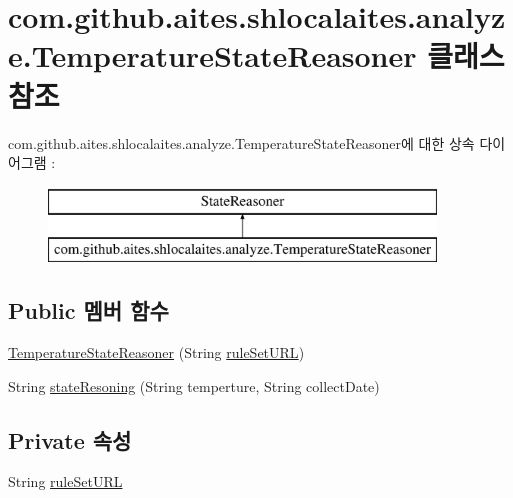 \hypertarget{classcom_1_1github_1_1aites_1_1shlocalaites_1_1analyze_1_1_temperature_state_reasoner}{}\section{com.\+github.\+aites.\+shlocalaites.\+analyze.\+Temperature\+State\+Reasoner 클래스 참조}
\label{classcom_1_1github_1_1aites_1_1shlocalaites_1_1analyze_1_1_temperature_state_reasoner}
com.\+github.\+aites.\+shlocalaites.\+analyze.\+Temperature\+State\+Reasoner에 대한 상속 다이어그램 \+: \begin{figure}[H]
\begin{center}
\leavevmode
\includegraphics[height=2.000000cm]{classcom_1_1github_1_1aites_1_1shlocalaites_1_1analyze_1_1_temperature_state_reasoner}
\end{center}
\end{figure}
\subsection*{Public 멤버 함수}
\begin{DoxyCompactItemize}
\item 
\mbox{\hyperlink{classcom_1_1github_1_1aites_1_1shlocalaites_1_1analyze_1_1_temperature_state_reasoner_aeb0acd0cdfb8efdc2eed85ad10fbeddb}{Temperature\+State\+Reasoner}} (String \mbox{\hyperlink{classcom_1_1github_1_1aites_1_1shlocalaites_1_1analyze_1_1_temperature_state_reasoner_af2c499ddf5d8d5cc0394b6ba37c948f7}{rule\+Set\+U\+RL}})
\item 
String \mbox{\hyperlink{classcom_1_1github_1_1aites_1_1shlocalaites_1_1analyze_1_1_temperature_state_reasoner_adefc280284e3d6d5f522fa23a83f54f6}{state\+Resoning}} (String temperture, String collect\+Date)
\end{DoxyCompactItemize}
\subsection*{Private 속성}
\begin{DoxyCompactItemize}
\item 
String \mbox{\hyperlink{classcom_1_1github_1_1aites_1_1shlocalaites_1_1analyze_1_1_temperature_state_reasoner_af2c499ddf5d8d5cc0394b6ba37c948f7}{rule\+Set\+U\+RL}}
\end{DoxyCompactItemize}


